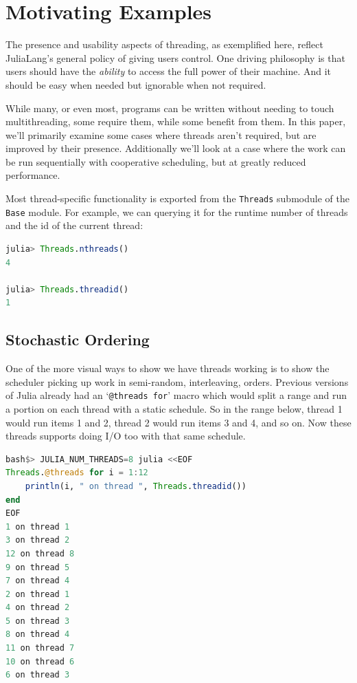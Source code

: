 \documentclass{juliacon}
\begin{document}
\section{Motivating Examples}
\label{subsub:motivation}

The presence and usability aspects of threading, as exemplified here, reflect JuliaLang's general policy of giving users control. One driving philosophy is that users should have the \textit{ability} to access the full power of their machine. And it should be easy when needed but ignorable when not required.

While many, or even most, programs can be written without needing to touch multithreading, some require them, while some benefit from them. In this paper, we'll primarily examine some cases where threads aren't required, but are improved by their presence. Additionally we'll look at a case where the work can be run sequentially with cooperative scheduling, but at greatly reduced performance.

Most thread-specific functionality is exported from the \verb|Threads| submodule of the \verb|Base| module. For example, we can querying it for the runtime number of threads and the id of the current thread:

\begin{lstlisting}[language = Julia]
julia> Threads.nthreads()
4

julia> Threads.threadid()
1
\end{lstlisting}

\subsection{Stochastic Ordering}
\label{subsub:pprint}

One of the more visual ways to show we have threads working is to show the scheduler picking up work in semi-random, interleaving, orders. Previous versions of Julia already had an `\verb|@threads for|' macro which would split a range and run a portion on each thread with a static schedule. So in the range below, thread 1 would run items 1 and 2, thread 2 would run items 3 and 4, and so on. Now these threads supports doing I/O too with that same schedule.

\begin{lstlisting}[language = Julia]
bash$> JULIA_NUM_THREADS=8 julia <<EOF
Threads.@threads for i = 1:12
    println(i, " on thread ", Threads.threadid())
end
EOF
1 on thread 1
3 on thread 2
12 on thread 8
9 on thread 5
7 on thread 4
2 on thread 1
4 on thread 2
5 on thread 3
8 on thread 4
11 on thread 7
10 on thread 6
6 on thread 3
\end{lstlisting}
\end{document}
